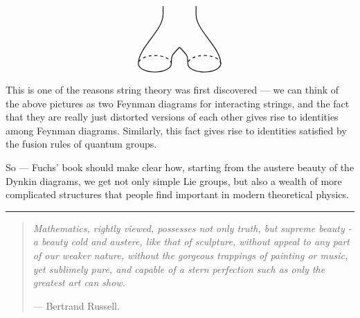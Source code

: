 \documentclass{article}
\begin{document}
\begin{enumerate}
\[\begin{tikzpicture}[scale=0.3]
\begin{scope}
       \end{scope}
       \begin{scope}[rotate=180,shift={(0,14)}]
         \begin{scope}[shift={(-3,0)},rotate=180]
           \draw[thick,dashed] (0:2) arc (0:180:2cm and 1cm);
           \draw[thick] (180:2) arc (180:360:2cm and 1cm);
         \end{scope}
         \begin{scope}[shift={(3,0)},rotate=180]
           \draw[thick,dashed] (0:2) arc (0:180:2cm and 1cm);
           \draw[thick] (180:2) arc (180:360:2cm and 1cm);
         \end{scope}
         \draw[thick] (-5,0) .. controls (-5,-2) and (-2,-4) .. (-2,-6);
         \draw[thick] (5,0) .. controls (5,-2) and (2,-4) .. (2,-6);
         \draw[thick] (-1,0) .. controls (-1,-1) .. (0,-2);
         \draw[thick] (1,0) .. controls (1,-1) .. (0,-2);
         \draw[thick] (-2,-6) to (-2,-7);
         \draw[thick] (2,-6) to (2,-7);
       \end{scope}
     \end{tikzpicture}
   \] This is one of the reasons string theory was first discovered ---
  we can think of the above pictures as two Feynman diagrams for
  interacting strings, and the fact that they are really just distorted
  versions of each other gives rise to identities among Feynman
  diagrams. Similarly, this fact gives rise to identities satisfied by
  the fusion rules of quantum groups.
\end{enumerate}

So --- Fuchs' book should make clear how, starting from the austere
beauty of the Dynkin diagrams, we get not only simple Lie groups, but
also a wealth of more complicated structures that people find important
in modern theoretical physics.

\begin{center}\rule{0.5\linewidth}{0.5pt}\end{center}

\begin{quote}
\emph{Mathematics, rightly viewed, possesses not only truth, but supreme
beauty - a beauty cold and austere, like that of sculpture, without
appeal to any part of our weaker nature, without the gorgeous trappings
of painting or music, yet sublimely pure, and capable of a stern
perfection such as only the greatest art can show.}

--- Bertrand Russell.
\end{quote}
\end{document}
